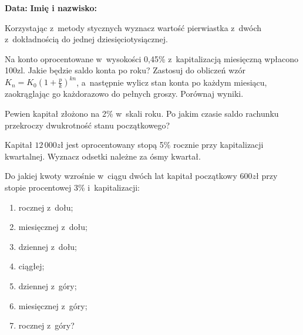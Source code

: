\documentclass[addpoints]{exam}
\begin{document}
\raggedleft \textbf {Data:\enspace\makebox[2in]{\hrulefill}} 
\hfill  \textbf{Imię i nazwisko: \enspace\makebox[2in]{\hrulefill}}
	
\vspace{0.1in}

	\begin{questions}

  \question
    Korzystając z~metody stycznych wyznacz wartość pierwiastka z~dwóch
    z~dokładnością do jednej dziesięciotysiącznej.

  \question
    Na konto oprocentowane w~wysokości 0,45\% z~kapitalizacją
    miesięczną wpłacono 100zl.  Jakie będzie saldo konta po roku?
    Zastosuj do obliczeń wzór $K_n=K_0(1+\frac{p}{k})^{kn}$,
    a~następnie wylicz stan konta po każdym miesiącu, zaokrąglając go
    każdorazowo do pełnych groszy.  Porównaj wyniki.

  \question
    Pewien kapitał złożono na 2\% w~skali roku.  Po jakim czasie saldo
    rachunku przekroczy dwukrotność stanu początkowego?

  \question
    Kapitał $12\,000zł$ jest oprocentowany stopą 5\% rocznie przy
    kapitalizacji kwartalnej.  Wyznacz odsetki należne za ósmy kwartał.

  \question
    Do jakiej kwoty wzrośnie w~ciągu dwóch lat kapitał początkowy $600zł$ przy
    stopie procentowej 3\% i~kapitalizacji:
    \begin{enumerate}
    \item rocznej z~dołu;
    \item miesięcznej z~dołu;
    \item dziennej z~dołu;
    \item ciągłej;
    \item dziennej z~góry;
    \item miesięcznej z~góry;
    \item rocznej z~góry?
    \end{enumerate}



	\end{questions}
\end{document}
